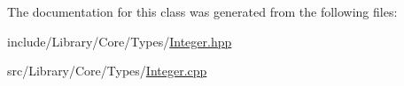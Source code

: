 The documentation for this class was generated from the following files\+:\begin{DoxyCompactItemize}
\item 
include/\+Library/\+Core/\+Types/\hyperlink{Integer_8hpp}{Integer.\+hpp}\item 
src/\+Library/\+Core/\+Types/\hyperlink{Integer_8cpp}{Integer.\+cpp}\end{DoxyCompactItemize}
